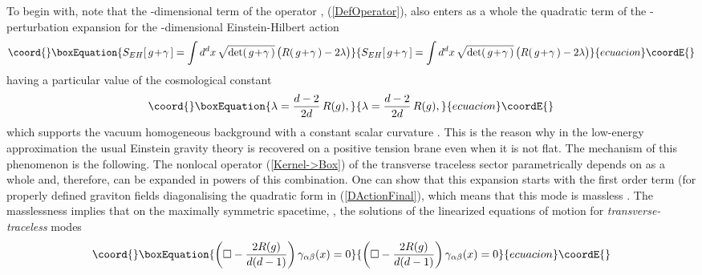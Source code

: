 \documentclass[a4paper,12pt]{article}
\providecommand{\za}{{\alpha}}   %
\providecommand{\zb}{{\beta}}    %
\providecommand{\ddim}{{d}}
\providecommand{\bBox}{\square}  %
\providecommand{\BBox}{\hat{\mathbf{F}}}  %
\begin{document}
To begin with, note that the \coordHE{}-dimensional term
\myHighlight{$\bBox-2R(g)/\ddim(\ddim-1)$}\coordHE{} of the operator \myHighlight{$\BBox$}\coordHE{},
(\ref{DefOperator}), also enters as a whole the quadratic term
\myHighlight{$\gamma_{\za\zb}\big(\bBox-2R(g)/\ddim(\ddim-1)\big)\gamma^{\za\zb}$}\coordHE{}
of the \myHighlight{$\gamma$}\coordHE{}-perturbation expansion for the \myHighlight{$\ddim$}\coordHE{}-dimensional
Einstein-Hilbert action
    \begin{equation}\coord{}\boxEquation{
    S_{EH}[\,g\!+\!\gamma\,]=
    \int d^{\ddim}x\,
    \sqrt{\det(\,g\!+\!\gamma\,)}\,
    \big(R(\,g\!+\!\gamma\,)-2\lambda\big)
    }{
    S_{EH}[\,g\!+\!\gamma\,]=
    \int d^{\ddim}x\,
    \sqrt{\det(\,g\!+\!\gamma\,)}\,
    \big(R(\,g\!+\!\gamma\,)-2\lambda\big)
    }{ecuacion}\coordE{}\end{equation}
having a particular value of the cosmological constant
    \begin{equation}\coord{}\boxEquation{
    \lambda=\frac{\ddim-2}{2\ddim}\,R(g),
    }{
    \lambda=\frac{\ddim-2}{2\ddim}\,R(g),
    }{ecuacion}\coordE{}\end{equation}
which supports the vacuum homogeneous background with a constant
scalar curvature \coordHE{}. This is the reason why in the low-energy
approximation the usual Einstein gravity theory is recovered on a
positive tension brane even when it is not flat. The mechanism of
this phenomenon is the following. The nonlocal operator
(\ref{Kernel->Box}) of the transverse traceless sector
parametrically depends on \myHighlight{$\bBox-2R(g)/\ddim(\ddim-1)$}\coordHE{} as a whole
and, therefore, can be expanded in powers of this combination. One
can show that this expansion starts with the first order term (for
properly defined graviton fields diagonalising the quadratic form
in (\ref{DActionFinal}), which means that this mode is massless
\cite{BWEA,BWEA2}. The masslessness implies that on the maximally
symmetric spacetime,
\coordHE{},
the solutions of the linearized equations of motion for {\em
transverse-traceless} modes
    \begin{equation}\coord{}\boxEquation{
    \left(\bBox-\frac{2R(g)}
    {\ddim(\ddim-1)}\right)
    \gamma_{\alpha\beta}(x)=0      \label{graveq}
    }{
    \left(\bBox-\frac{2R(g)}
    {\ddim(\ddim-1)}\right)
    \gamma_{\alpha\beta}(x)=0      }{ecuacion}\coordE{}\end{equation}
\end{document}
